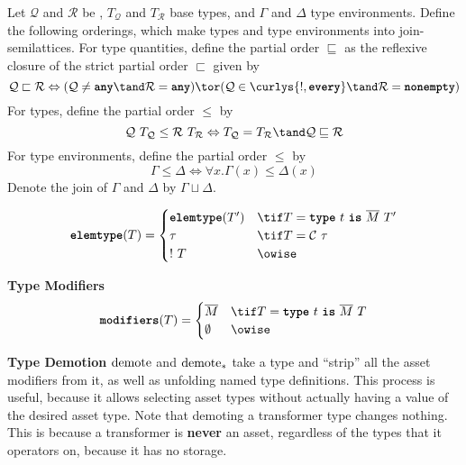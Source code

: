 \documentclass[10pt]{article}
\begin{document}
\begin{definition}
    Let $\mathcal{Q}$ and $\mathcal{R}$ be \typeQuantities, $T_\mathcal{Q}$ and $T_\mathcal{R}$ base types, and $\Gamma$ and $\Delta$ type environments.
    Define the following orderings, which make types and type environments into join-semilattices.
    For type quantities, define the partial order $\sqsubseteq$ as the reflexive closure of the strict partial order $\sqsubset$ given by
    \[
        \mathcal{Q} \sqsubset \mathcal{R} \iff (\mathcal{Q} \neq \any \tand \mathcal{R} = \any) \tor (\mathcal{Q} \in \curlys{\exactlyone, \every} \tand \mathcal{R} = \nonempty)
    \]
    For types, define the partial order $\leq$ by
    \[
        \mathcal{Q}~T_\mathcal{Q} \leq \mathcal{R}~T_\mathcal{R} \iff T_\mathcal{Q} = T_\mathcal{R} \tand \mathcal{Q} \sqsubseteq \mathcal{R}
    \]
    For type environments, define the partial order $\leq$ by
    \[
        \Gamma \leq \Delta \iff \forall x. \Gamma(x) \leq \Delta(x)
    \]
    Denote the join of $\Gamma$ and $\Delta$ by $\Gamma \sqcup \Delta$.
\end{definition}

\begin{align*}
    \elemtype(T) =
    \begin{cases}
        \elemtype(T') & \tif T = \type~t~\is~\overline{M}~T' \\
        \tau & \tif T = \mathcal{C}~\tau \\
        !~T & \owise
    \end{cases}
\end{align*}

 \textbf{Type Modifiers}
\begin{align*}
    \modifiers(T) =
    \begin{cases}
        \overline{M} & \tif T = \type~t~\is~\overline{M}~T \\
        \emptyset & \owise
    \end{cases}
\end{align*}

\framebox{$\demote(\tau) = \sigma$}
 \textbf{Type Demotion}
$\text{demote}$ and $\text{demote}_*$ take a type and ``strip'' all the asset modifiers from it, as well as unfolding named type definitions.
This process is useful, because it allows selecting asset types without actually having a value of the desired asset type.
Note that demoting a transformer type changes nothing.
This is because a transformer is \textbf{never} an asset, regardless of the types that it operators on, because it has no storage.
\end{document}
